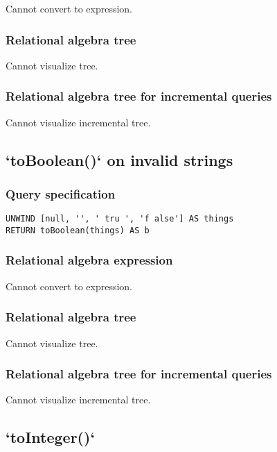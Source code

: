 Cannot convert to expression.

\subsubsection*{Relational algebra tree}

Cannot visualize tree.

\subsubsection*{Relational algebra tree for incremental queries}

Cannot visualize incremental tree.

\subsection{`toBoolean()` on invalid strings}

\subsubsection*{Query specification}

\begin{lstlisting}
UNWIND [null, '', ' tru ', 'f alse'] AS things
RETURN toBoolean(things) AS b
\end{lstlisting}

\subsubsection*{Relational algebra expression}

Cannot convert to expression.

\subsubsection*{Relational algebra tree}

Cannot visualize tree.

\subsubsection*{Relational algebra tree for incremental queries}

Cannot visualize incremental tree.

\subsection{`toInteger()`}

